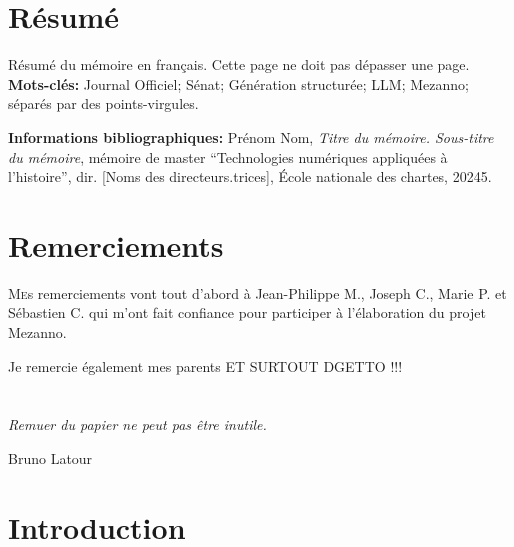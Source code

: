 \documentclass[12pt,twoside]{book}
\begin{document}
\frontmatter

	\chapter{Résumé}
\medskip
	Résumé du mémoire en français. Cette page ne doit pas dépasser une page.\\
	
	\textbf{Mots-clés:} Journal Officiel; Sénat; Génération structurée; LLM; Mezanno; séparés par des points-virgules.
	
	\textbf{Informations bibliographiques:} Prénom Nom, \textit{Titre du mémoire. Sous-titre du mémoire}, mémoire de master \enquote{Technologies numériques appliquées à l'histoire}, dir. [Noms des directeurs.trices], École nationale des chartes, 20245.
	
		\newpage{\pagestyle{empty}\cleardoublepage}
	
	\chapter{Remerciements}
	
\lettrine{M}es remerciements vont tout d'abord à Jean-Philippe M., Joseph C., Marie P. et Sébastien C. qui m'ont fait confiance pour participer à l'élaboration du projet Mezanno. 

Je remercie également mes parents ET SURTOUT DGETTO !!!
	\newpage{\pagestyle{empty}\cleardoublepage}
	





\chapter{}
\vspace*{\fill} 
\epigraph{\itshape Remuer du papier ne peut pas être inutile.}{Bruno Latour}

\vfill\clearpage

	
\chapter{Introduction}	

\end{document}
